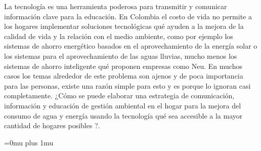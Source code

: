\documentclass[a4paper,man,natbib]{apa6}
\begin{document}
La tecnología es una herramienta poderosa para transmitir y comunicar información clave para la educación. En Colombia el costo de vida no permite a los hogares implementar soluciones tecnológicas qué ayuden a la mejora de la calidad de vida y la relación con el medio ambiente, como por ejemplo los sistemas de ahorro energético basados en el aprovechamiento de la energía solar o los sistemas para el aprovechamiento de las aguas lluvias, mucho menos los sistemas de ahorro inteligente qué proponen empresas como Neu. En muchos casos los temas alrededor de este problema son ajenos y de poca importancia para las personas, existe una razón simple para esto y es porque lo ignoran casi completamente. ¿Cómo se puede elaborar una estrategia de comunicación, información y educación de gestión ambiental en el hogar para la mejora del consumo de agua y energía usando la tecnología qué sea accesible a la mayor cantidad de hogares posibles ?.\newline

\nocite{*}

\Urlmuskip=0mu plus 1mu\relax


\end{document}
